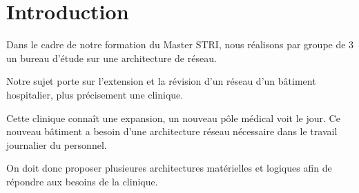 \section*{Introduction} %

%
%

Dans le cadre de notre formation du Master STRI, nous réalisons par groupe de 3 un bureau d'étude sur une architecture de réseau.

%

Notre sujet porte sur l'extension et la révision d'un réseau d'un bâtiment hospitalier, plus précisement une clinique.

%

Cette clinique connaît une expansion, un nouveau pôle médical voit le jour.
Ce nouveau bâtiment a besoin d'une architecture réseau nécessaire dans le travail journalier du personnel.

%

On doit donc proposer plusieures architectures matérielles et logiques afin de répondre aux besoins de la clinique.

%
%


